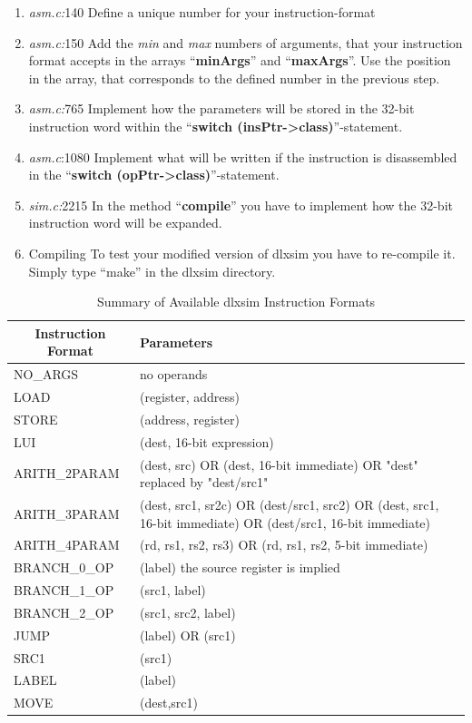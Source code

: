 \begin{enumerate}
\item
  \emph{asm.c:}140 Define a unique number for your instruction-format
\item
  \emph{asm.c:}150 Add the \emph{min} and \emph{max} numbers of
  arguments, that your instruction format accepts in the arrays
  ``\textbf{minArgs}'' and ``\textbf{maxArgs}''. Use the position in the
  array, that corresponds to the defined number in the previous step.
\item
  \emph{asm.c:}765 Implement how the parameters will be stored in the
  32-bit instruction word within the ``\textbf{switch
  (insPtr-\textgreater class)}''-statement.
\item
  \emph{asm.c}:1080 Implement what will be written if the instruction is
  disassembled in the ``\textbf{switch
  (opPtr-\textgreater class)}''-statement.
\item
  \emph{sim.c:}2215 In the method ``\textbf{compile}'' you have to
  implement how the 32-bit instruction word will be expanded.
\item
  Compiling To test your modified version of dlxsim you have to
  re-compile it. Simply type ``make'' in the dlxsim directory.
\end{enumerate}
\begin{table}[!htb]
	\centering
	\begin{tabular}{|l|p{13cm}|}
		\hline
		\multicolumn{1}{|c|}{\textbf{Instruction Format}} & \textbf{Parameters}                                                               \\ \hline
		NO\_ARGS & no operands\\\hline
		LOAD & (register, address)\\\hline
		STORE & (address, register)\\\hline
		LUI & (dest, 16-bit expression)\\\hline
		ARITH\_2PARAM & (dest, src) OR (dest, 16-bit immediate) OR "dest"
		replaced by "dest/src1"\\\hline
		ARITH\_3PARAM & (dest, src1, sr2c) OR (dest/src1, src2) OR (dest, src1,
		16-bit immediate) OR (dest/src1, 16-bit immediate)\\\hline
		ARITH\_4PARAM & (rd, rs1, rs2, rs3) OR (rd, rs1, rs2, 5-bit
		immediate)\\\hline
		BRANCH\_0\_OP & (label) the source register is implied\\\hline
		BRANCH\_1\_OP & (src1, label)\\\hline
		BRANCH\_2\_OP & (src1, src2, label)\\\hline
		JUMP & (label) OR (src1)\\\hline
		SRC1 & (src1)\\\hline
		LABEL & (label)\\\hline
		MOVE & (dest,src1)\\\hline
	\end{tabular}
	\caption{Summary of Available dlxsim Instruction Formats}
	\label{fig:fig36}
\end{table}
